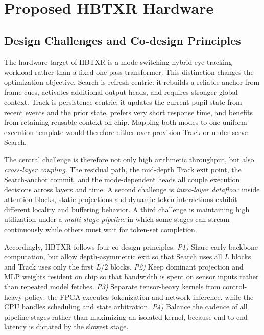 \documentclass[journal]{IEEEtran}
\begin{document}
\section{Proposed HBTXR Hardware}
\subsection{Design Challenges and Co-design Principles}
The hardware target of HBTXR is a mode-switching hybrid eye-tracking workload rather than a fixed one-pass transformer. This distinction changes the optimization objective. Search is refresh-centric: it rebuilds a reliable anchor from frame cues, activates additional output heads, and requires stronger global context. Track is persistence-centric: it updates the current pupil state from recent events and the prior state, prefers very short response time, and benefits from retaining reusable context on chip. Mapping both modes to one uniform execution template would therefore either over-provision Track or under-serve Search.

The central challenge is therefore not only high arithmetic throughput, but also \emph{cross-layer coupling}. The residual path, the mid-depth Track exit point, the Search-anchor commit, and the mode-dependent heads all couple execution decisions across layers and time. A second challenge is \emph{intra-layer dataflow}: inside attention blocks, static projections and dynamic token interactions exhibit different locality and buffering behavior. A third challenge is maintaining high utilization under a \emph{multi-stage pipeline} in which some stages can stream continuously while others must wait for token-set completion.

Accordingly, HBTXR follows four co-design principles. \emph{P1)} Share early backbone computation, but allow depth-asymmetric exit so that Search uses all $L$ blocks and Track uses only the first $L/2$ blocks. \emph{P2)} Keep dominant projection and MLP weights resident on chip so that bandwidth is spent on sensor inputs rather than repeated model fetches. \emph{P3)} Separate tensor-heavy kernels from control-heavy policy: the FPGA executes tokenization and network inference, while the CPU handles scheduling and state arbitration. \emph{P4)} Balance the cadence of all pipeline stages rather than maximizing an isolated kernel, because end-to-end latency is dictated by the slowest stage.
\end{document}
